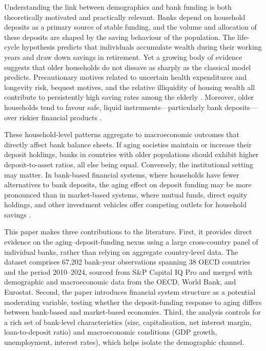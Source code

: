\documentclass[12pt,a4paper]{article}
\begin{document}
Understanding the link between demographics and bank funding is both theoretically motivated and practically relevant. Banks depend on household deposits as a primary source of stable funding, and the volume and allocation of these deposits are shaped by the saving behaviour of the population. The life-cycle hypothesis \citep{Modigliani1954, Ando1963} predicts that individuals accumulate wealth during their working years and draw down savings in retirement. Yet a growing body of evidence suggests that older households do not dissave as sharply as the classical model predicts. Precautionary motives related to uncertain health expenditures and longevity risk, bequest motives, and the relative illiquidity of housing wealth all contribute to persistently high saving rates among the elderly \citep{DeNardi2010, Poterba2011}. Moreover, older households tend to favour safe, liquid instruments---particularly bank deposits---over riskier financial products \citep{Boersch-Supan2003}.

These household-level patterns aggregate to macroeconomic outcomes that directly affect bank balance sheets. If aging societies maintain or increase their deposit holdings, banks in countries with older populations should exhibit higher deposit-to-asset ratios, all else being equal. Conversely, the institutional setting may matter. In bank-based financial systems, where households have fewer alternatives to bank deposits, the aging effect on deposit funding may be more pronounced than in market-based systems, where mutual funds, direct equity holdings, and other investment vehicles offer competing outlets for household savings \citep{Levine2002, Allen2000}.

This paper makes three contributions to the literature. First, it provides direct evidence on the aging--deposit-funding nexus using a large cross-country panel of individual banks, rather than relying on aggregate country-level data. The dataset comprises 67,202 bank-year observations spanning 38 OECD countries and the period 2010--2024, sourced from S\&P Capital IQ Pro and merged with demographic and macroeconomic data from the OECD, World Bank, and Eurostat. Second, the paper introduces financial system structure as a potential moderating variable, testing whether the deposit-funding response to aging differs between bank-based and market-based economies. Third, the analysis controls for a rich set of bank-level characteristics (size, capitalisation, net interest margin, loan-to-deposit ratio) and macroeconomic conditions (GDP growth, unemployment, interest rates), which helps isolate the demographic channel.
\end{document}

